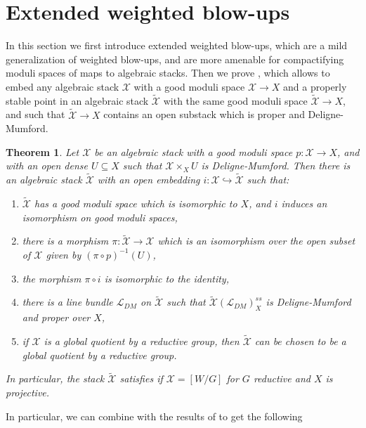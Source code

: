 \documentclass{amsart}
\newcommand{\cL}{\mathcal{L}}
\newcommand{\cX}{\mathcal{X}}
\newtheorem{Teo}[theorem]{Theorem}
\theoremstyle{definition}
\theoremstyle{definition}
\begin{document}
{\section{Extended weighted blow-ups}\label{section_extended_blowups}
In this section we first introduce extended weighted blow-ups, which are a mild generalization of weighted blow-ups, and are more amenable for compactifying moduli spaces of maps to algebraic stacks. Then we prove , which allows to embed any algebraic stack $\cX$ with a good moduli space $\cX\to X$ and a properly stable point in an algebraic stack $\widetilde{\cX}$ with the same good moduli space $\widetilde{\cX}\to X$, and such that $\widetilde{\cX}\to X$ contains an open substack which is proper and Deligne-Mumford.
\begin{Teo}\label{thm_you_can_embed_a_Stack_in_one_with_open_dm_by_taking_deformations_to_nc}
    Let $\cX$ be an algebraic stack with a good moduli space $p:\cX\to X$, and with an open dense $U\subseteq X$ such that $\cX\times_XU$ is Deligne-Mumford. Then there is an algebraic stack $\widetilde{\cX}$ with an open embedding $i:\cX\hookrightarrow \widetilde{\cX}$ such that:
    \begin{enumerate}
        \item $\widetilde{\cX}$ has a good moduli space which is isomorphic to $X$, and $i$ induces an isomorphism on good moduli spaces, 
        \item there is a morphism $\pi:\widetilde{\cX}\to \cX$ which is an isomorphism over the open subset of $\cX$ given by $(\pi\circ p)^{-1}(U)$,
        \item the morphism $\pi\circ i$ is isomorphic to the identity,
        \item there is a line bundle $\cL_{DM}$ on $\widetilde{\cX}$ such that $\widetilde{\cX}(\cL_{DM})^{ss}_X$ is  Deligne-Mumford and proper over $X$,
        \item if $\cX$ is a global quotient by a reductive group, then $\widetilde{\cX}$ can be chosen to be a global quotient by a reductive group.
    \end{enumerate}
    In particular, the stack $\widetilde{\cX}$ satisfies  if $\cX=[W/G]$ for $G$ reductive and $X$ is projective.
\end{Teo}
In particular, we can combine  with the results of  to get the following
}
\end{document}
